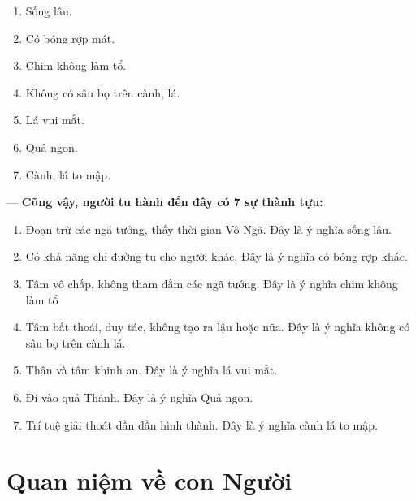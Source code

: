 \begin{enumerate}[label=\itshape\arabic*\upshape/]

    \item Sống lâu.

    \item Có bóng rợp mát.

    \item Chim không làm tổ.

    \item Không có sâu bọ trên cành, lá.

    \item Lá vui mắt.

    \item Quả ngon.

    \item Cành, lá to mập.
\end{enumerate}

— {\bf Cũng vậy, người tu hành đến đây có 7 sự thành tựu:}

\begin{enumerate}[label=\itshape\arabic*\upshape/]
    \item Đoạn trừ các ngã tưởng, thấy thời gian Vô Ngã. Đây là ý nghĩa sống lâu.

    \item Có khả năng chỉ đường tu cho người khác. Đây là ý nghĩa có bóng rợp khác.

    \item Tâm vô chấp, không tham đắm các ngã tướng. Đây là ý nghĩa chim không làm tổ

    \item Tâm bất thoái, duy tác, không tạo ra lậu hoặc nữa. Đây là ý nghĩa không có sâu bọ trên cành lá.

    \item Thân và tâm khinh an. Đây là ý nghĩa lá vui mắt.

    \item Đi vào quả Thánh. Đây là ý nghĩa Quả ngon.

    \item Trí tuệ giải thoát dần dần hình thành. Đây là ý nghĩa cành lá to mập.
\end{enumerate}

\section{Quan niệm về con Người} %
\label{sec:67_con_nguoi}

